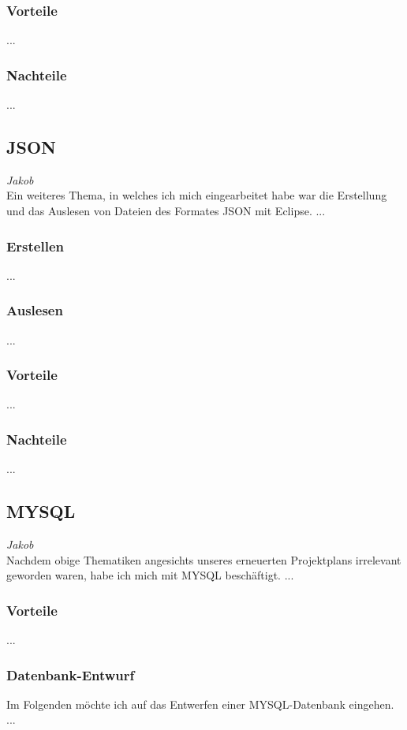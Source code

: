 \documentclass[12pt,a4paper,bibliography=totocnumbered,listof=totocnumbered]{scrartcl}
\begin{document}
\subsubsection{Vorteile}
...

\subsubsection{Nachteile}
...

\subsection{JSON}
\label{sec:JSON}
\emph{Jakob}\\
Ein weiteres Thema, in welches ich mich eingearbeitet habe war die Erstellung und das Auslesen von Dateien
des Formates JSON mit Eclipse.
...

\subsubsection{Erstellen}
...

\subsubsection{Auslesen}
...

\subsubsection{Vorteile}
...

\subsubsection{Nachteile}
...

\subsection{MYSQL}
\label{sec:MYSQL}
\emph{Jakob}\\
Nachdem obige Thematiken angesichts unseres erneuerten Projektplans irrelevant geworden waren, habe ich mich 
mit MYSQL beschäftigt.
...

\subsubsection{Vorteile}
...

\subsubsection{Datenbank-Entwurf}
Im Folgenden möchte ich auf das Entwerfen einer MYSQL-Datenbank eingehen.
...
\end{document}
